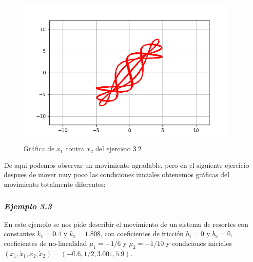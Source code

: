 \documentclass{article}
\begin{document}
\begin{figure}[ht!]
\centering
\includegraphics[width=\linewidth]{ejercicio32-versus.png}
\caption{Gráfica de $x_1$ contra $x_2$ del ejercicio 3.2}
\end{figure}

De aqui podemos observar un movimiento agradable, pero en el siguiente ejercicio despues de mover muy poco las condiciones iniciales obtenemos gráficas del movimiento totalmente diferentes:

\newpage

\subsubsection*{\textit{Ejemplo 3.3}}
En este ejemplo se nos pide describir el movimiento de un sistema de resortes con constantes $k_1=0.4$ y $k_2=1.808$, con coeficientes de fricción $b_1=0$ y $b_2=0$, coeficientes de no-linealidad $\mu_1=-1/6$ y $\mu_2=-1/10$ y condiciones iniciales $(x_1,\dot{x}_1,x_2,\dot{x}_2)=(-0.6,1/2,3.001,5.9)$.
\end{document}

